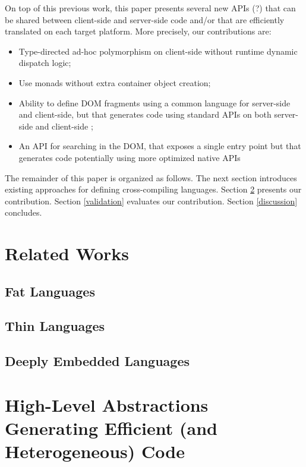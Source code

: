 \documentclass[preprint]{sigplanconf}
\begin{document}
On top of this previous work, this paper presents several new APIs (?) that can be shared between client-side and
server-side code and/or that are efficiently translated on each target platform. More precisely, our contributions
are:

\begin{itemize}
 \item Type-directed ad-hoc polymorphism on client-side without runtime dynamic dispatch logic;
 \item Use monads without extra container object creation;
 \item Ability to define DOM fragments using a common language for server-side and client-side, but that generates
code using standard APIs on both server-side and client-side ;
 \item An API for searching in the DOM, that exposes a single entry point but that generates code potentially using
more optimized native APIs
\end{itemize}

The remainder of this paper is organized as follows. The next section introduces existing approaches for defining
cross-compiling languages. Section \ref{contribution} presents our contribution. Section \ref{validation} evaluates
our contribution. Section \ref{discussion} concludes.

\section{Related Works}

\subsection{Fat Languages}

\subsection{Thin Languages}

\subsection{Deeply Embedded Languages}

\section{High-Level Abstractions Generating Efficient (and Heterogeneous) Code}
\label{contribution}
\end{document}

